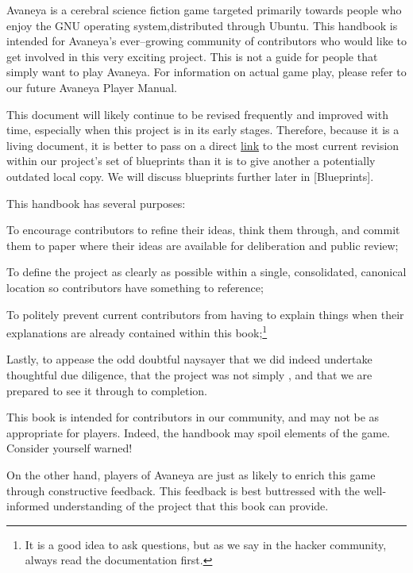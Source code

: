 

Avaneya is a cerebral science fiction game targeted primarily towards people who enjoy the GNU operating system, distributed through Ubuntu. This handbook is intended for Avaneya's ever--growing community of contributors who would like to get involved in this very exciting project. This is not a guide for people that simply want to play Avaneya. For information on actual game play, please refer to our future Avaneya Player Manual.

This document will likely continue to be revised frequently and improved with time, especially when this project is in its early stages. Therefore, because it is a living document, it is better to pass on a direct \href{\LatestHandbookURL}{link} to the most current revision within our project's set of blueprints than it is to give another a potentially outdated local copy. We will discuss blueprints further later in [Blueprints].

This handbook has several purposes:

\startitemize[4]
\item
To encourage contributors to refine their ideas, think them through, and commit them to paper where their ideas are available for deliberation and public review;

\item
To define the project as clearly as possible within a single, consolidated, canonical location so contributors have something to reference;

\item
To politely prevent current contributors from having to explain things when their explanations are already contained within this book;\footnote[rtfm]{It is a good idea to ask questions, but as we say in the hacker community, always read the documentation first.}

\item
Lastly, to appease the odd doubtful naysayer that we did indeed undertake thoughtful due diligence, that the project was not simply , and that we are prepared to see it through to completion.
\stopitemize

This book is intended for contributors in our community, and may not be as appropriate for players. Indeed, the handbook may spoil elements of the game. Consider yourself warned!

On the other hand, players of Avaneya are just as likely to enrich this game through constructive feedback. This feedback is best buttressed with the well-informed understanding of the project that this book can provide.

\StopChapter
